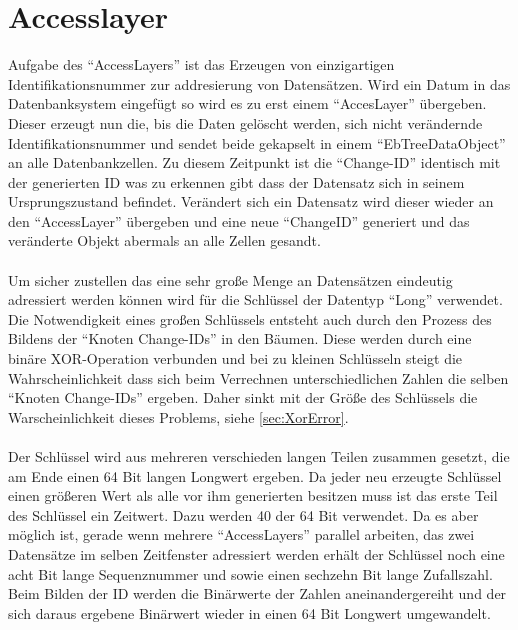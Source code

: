 \documentclass[a4paper,11pt,oneside,%
headsepline,												%
footsepline,												%
bibtotocnumbered									%
]{scrreprt}
\begin{document}
\section{Accesslayer}
Aufgabe des \enquote{AccessLayers} ist das Erzeugen von einzigartigen Identifikationsnummer zur addresierung von Datensätzen. Wird ein Datum in das Datenbanksystem eingefügt so wird es zu erst einem \enquote{AccesLayer} übergeben. Dieser erzeugt nun die, bis die Daten gelöscht werden, sich nicht verändernde Identifikationsnummer und sendet beide gekapselt in einem \enquote{EbTreeDataObject} an alle Datenbankzellen. Zu diesem Zeitpunkt ist die \enquote{Change-ID} identisch mit der generierten \ac{ID} was zu erkennen gibt dass der Datensatz sich in seinem Ursprungszustand befindet. Verändert sich ein Datensatz wird dieser wieder an den \enquote{AccessLayer} übergeben und eine neue \enquote{ChangeID} generiert und das veränderte Objekt abermals an alle Zellen gesandt.\\\\
Um sicher zustellen das eine sehr große Menge an Datensätzen eindeutig adressiert werden können wird für die Schlüssel der Datentyp \enquote{Long} verwendet. Die Notwendigkeit eines großen Schlüssels entsteht auch durch den Prozess des Bildens der \enquote{Knoten Change-IDs} in den Bäumen. Diese werden durch eine binäre XOR-Operation verbunden und bei zu kleinen Schlüsseln steigt die Wahrscheinlichkeit dass sich beim Verrechnen unterschiedlichen Zahlen die selben \enquote{Knoten Change-IDs} ergeben. Daher sinkt mit der Größe des Schlüssels die Warscheinlichkeit dieses Problems, siehe \autoref{sec:XorError}.\\\\
Der Schlüssel wird aus mehreren verschieden langen Teilen zusammen gesetzt, die am Ende einen 64 Bit langen Longwert ergeben. Da jeder neu erzeugte Schlüssel einen größeren Wert als alle vor ihm generierten besitzen muss ist das erste Teil des Schlüssel ein Zeitwert. Dazu werden 40 der 64 Bit verwendet. Da es aber möglich ist, gerade wenn mehrere \enquote{AccessLayers} parallel arbeiten, das zwei Datensätze im selben Zeitfenster adressiert werden erhält der Schlüssel noch eine acht Bit lange Sequenznummer und sowie einen sechzehn Bit lange Zufallszahl. Beim Bilden der ID werden die Binärwerte der Zahlen aneinandergereiht und der sich daraus ergebene Binärwert wieder in einen 64 Bit Longwert umgewandelt.
\end{document}
